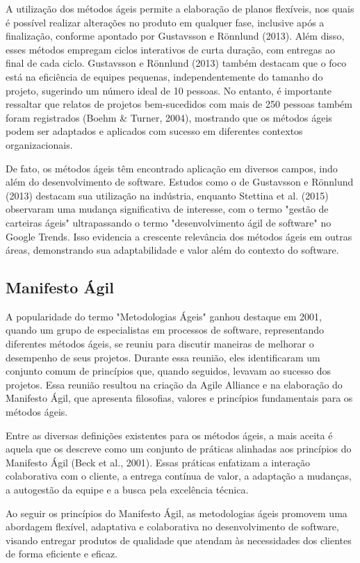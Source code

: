 A utilização dos métodos ágeis permite a elaboração de planos flexíveis, nos quais é possível realizar alterações no produto em qualquer fase, inclusive após a finalização, conforme apontado por Gustavsson e Rönnlund (2013). Além disso, esses métodos empregam ciclos interativos de curta duração, com entregas ao final de cada ciclo. Gustavsson e Rönnlund (2013) também destacam que o foco está na eficiência de equipes pequenas, independentemente do tamanho do projeto, sugerindo um número ideal de 10 pessoas. No entanto, é importante ressaltar que relatos de projetos bem-sucedidos com mais de 250 pessoas também foram registrados (Boehm \& Turner, 2004), mostrando que os métodos ágeis podem ser adaptados e aplicados com sucesso em diferentes contextos organizacionais.

De fato, os métodos ágeis têm encontrado aplicação em diversos campos, indo além do desenvolvimento de software. Estudos como o de Gustavsson e Rönnlund (2013) destacam sua utilização na indústria, enquanto Stettina et al. (2015) observaram uma mudança significativa de interesse, com o termo "gestão de carteiras ágeis" ultrapassando o termo "desenvolvimento ágil de software" no Google Trends. Isso evidencia a crescente relevância dos métodos ágeis em outras áreas, demonstrando sua adaptabilidade e valor além do contexto do software.

\subsection{Manifesto Ágil}
A popularidade do termo "Metodologias Ágeis" ganhou destaque em 2001, quando um grupo de especialistas em processos de software, representando diferentes métodos ágeis, se reuniu para discutir maneiras de melhorar o desempenho de seus projetos. Durante essa reunião, eles identificaram um conjunto comum de princípios que, quando seguidos, levavam ao sucesso dos projetos. Essa reunião resultou na criação da Agile Alliance e na elaboração do Manifesto Ágil, que apresenta filosofias, valores e princípios fundamentais para os métodos ágeis.

Entre as diversas definições existentes para os métodos ágeis, a mais aceita é aquela que os descreve como um conjunto de práticas alinhadas aos princípios do Manifesto Ágil (Beck et al., 2001). Essas práticas enfatizam a interação colaborativa com o cliente, a entrega contínua de valor, a adaptação a mudanças, a autogestão da equipe e a busca pela excelência técnica.

Ao seguir os princípios do Manifesto Ágil, as metodologias ágeis promovem uma abordagem flexível, adaptativa e colaborativa no desenvolvimento de software, visando entregar produtos de qualidade que atendam às necessidades dos clientes de forma eficiente e eficaz.

